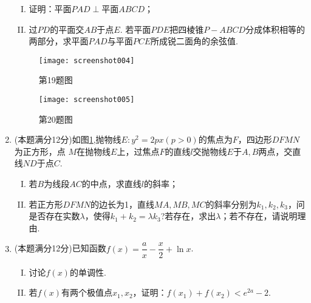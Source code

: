\documentclass[11pt]{article}
\begin{document}
\begin{enumerate}
	\begin{enumerate}[(I)]
		\item 证明：平面$ PAD\perp $平面$ ABCD $；
		\item 过$ PD $的平面交$ AB $于点$ E $. 若平面$ PDE $把四棱锥$ P-ABCD $分成体积相等的两部分，求平面$ PAD $与平面$ PCE $所成锐二面角的余弦值.	
	\end{enumerate}
	\begin{figure}[htbp]
	\centering
	\begin{minipage}{200pt}
		\centering
		\texttt{[image: screenshot004]}
		\caption{\heiti 第19题图}
		\label{fig:screenshot004}
	\end{minipage}
	\begin{minipage}{200pt}
		\centering
		\texttt{[image: screenshot005]}
		\caption{\heiti 第20题图}
		\label{fig:screenshot005}
	\end{minipage}
\end{figure}
	\item (本题满分12分)如图\ref{fig:screenshot005},抛物线$ E:y^2=2px (p>0)$的焦点为$ F $，四边形$ DFMN $为正方形，点 $ M $在抛物线$ E $上，过焦点$ F $的直线$ l $交抛物线$ E $于$ A,B $两点，交直线$ ND $于点$ C $.
	\begin{enumerate}[(I)]
		\item 若$ B $为线段$ AC $的中点，求直线$ l $的斜率；
		\item 若正方形$ DFMN $的边长为1，直线$ MA,MB,MC $的斜率分别为$ k_1,k_2,k_3 $，问是否存在实数$ \lambda $，使得$ k_1+k_2=\lambda k_3 $?若存在，求出$ \lambda $；若不存在，请说明理由.
	\end{enumerate}
	\item (本题满分12分)已知函数$ f(x)=\dfrac{a}{x}-\dfrac{x}{2}+\ln x $.
	\begin{enumerate}[(I)]
		\item 讨论$ f(x) $的单调性.
		\item 若$ f(x) $有两个极值点$ x_1,x_2 $，证明：$ f(x_1)+f(x_2)<e^{2a}-2 $.
	\end{enumerate}
\end{enumerate}
\end{document}
